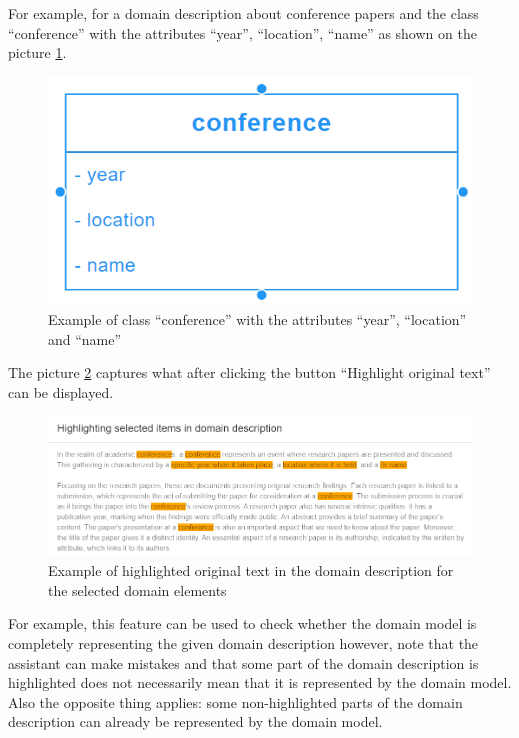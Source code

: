 For example, for a domain description about conference papers and the class ``conference'' with the attributes ``year'', ``location'', ``name'' as shown on the picture \ref{fig:class_example}.

\begin{figure}[!h]
    \includegraphics[scale=0.29]{../docs/images/frontend/class-example.png}
    \caption{\centering Example of class ``conference'' with the attributes ``year'', ``location'' and ``name''}
    \label{fig:class_example}
\end{figure}

The picture \ref{fig:highlight_all_example} captures what after clicking the button ``Highlight original text'' can be displayed.

\begin{figure}[!h]
    \includegraphics[scale=0.4]{../docs/images/frontend/highlight-all-example.png}
    \caption{\centering Example of highlighted original text in the domain description for the selected domain elements}
    \label{fig:highlight_all_example}
\end{figure}


For example, this feature can be used to check whether the domain model is completely representing the given domain description however, note that the assistant can make mistakes and that some part of the domain description is highlighted does not necessarily mean that it is represented by the domain model. Also the opposite thing applies: some non-highlighted parts of the domain description can already be represented by the domain model.

